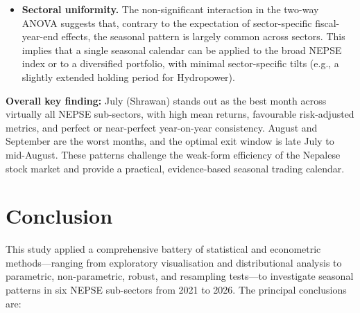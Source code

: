 \documentclass[12pt,a4paper,fleqn]{article}
\begin{document}
\begin{itemize}
    \item \textbf{Sectoral uniformity.} The non-significant interaction in the two-way ANOVA suggests that, contrary to the expectation of sector-specific fiscal-year-end effects, the seasonal pattern is largely common across sectors. This implies that a single seasonal calendar can be applied to the broad NEPSE index or to a diversified portfolio, with minimal sector-specific tilts (e.g., a slightly extended holding period for Hydropower).
\end{itemize}

\noindent
\textbf{Overall key finding:} July (Shrawan) stands out as the best month across virtually all NEPSE sub-sectors, with high mean returns, favourable risk-adjusted metrics, and perfect or near-perfect year-on-year consistency. August and September are the worst months, and the optimal exit window is late July to mid-August. These patterns challenge the weak-form efficiency of the Nepalese stock market and provide a practical, evidence-based seasonal trading calendar.

\section{Conclusion}

This study applied a comprehensive battery of statistical and econometric methods—ranging from exploratory visualisation and distributional analysis to parametric, non-parametric, robust, and resampling tests—to investigate seasonal patterns in six NEPSE sub-sectors from 2021 to 2026. The principal conclusions are:
\end{document}
